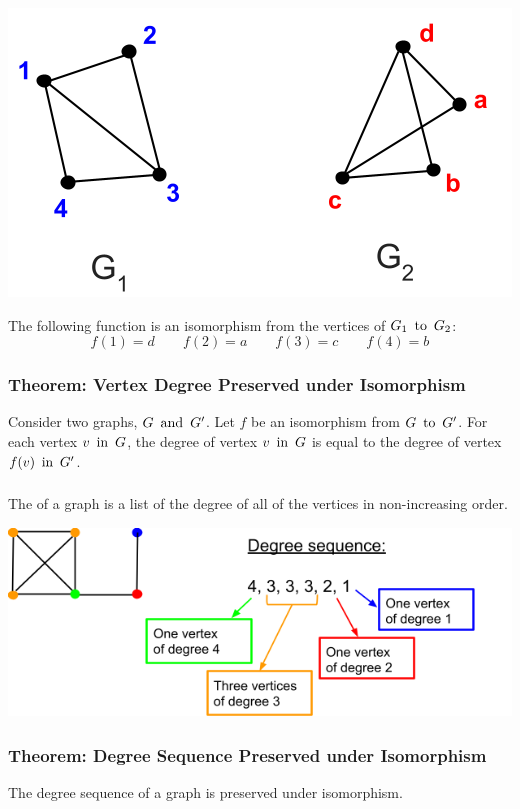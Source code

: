 \begin{center}
  \includegraphics[width=0.4\linewidth]{resources/isomorphic graphs 1.png}
\end{center}
The following function is an isomorphism from the vertices of $G_1 \operatorname{~\text{to}~} G_2$:
\[
  f(1) = d \qquad f(2) = a \qquad f(3) = c \qquad f(4) = b
\]

\subsubsection*{Theorem: Vertex Degree Preserved under Isomorphism}
Consider two graphs, $G \operatorname{~\text{and}~} G'$. Let $f$ be an isomorphism from $G \operatorname{~\text{to}~} G'$. For each vertex $v \operatorname{~\text{in}~} G$, the degree of vertex $v \operatorname{~\text{in}~} G$ is equal to the degree of vertex $f(v) \operatorname{~\text{in}~} G'$.

\subsubsection*{}
The  of a graph is a list of the degree of all of the vertices in non-increasing order.
\begin{center}
  \includegraphics[width=0.7\linewidth]{resources/degree-sequence.png}
\end{center}

\subsubsection*{Theorem: Degree Sequence Preserved under Isomorphism}
The degree sequence of a graph is preserved under isomorphism.


